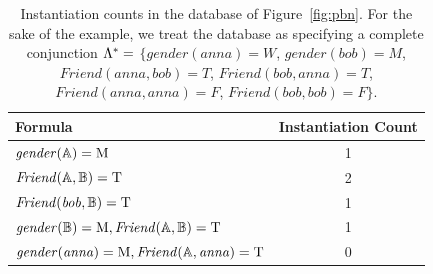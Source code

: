 \documentclass[twoside,11pt]{article}
\begin{document}
\begin{table}[htdp]
\caption{Instantiation counts in the database of Figure~\ref{fig:pbn}. For the sake of the example, we treat the database as specifying a complete conjunction $\Lambda^{*}\hspace{0.0ex} =$  $\{gender(anna) = W$,  $gender(bob) = M$, $Friend(anna,bob) = T$, $Friend(bob,anna) = T$, $Friend(anna,anna) = F$, $Friend(bob,bob) = F
\}$.}
\begin{center}
\begin{tabular}{lc}
Formula & Instantiation Count\\\hline
$\it{gender}(\mathbb{A}) = \mathrm{M}$ & 1 \\
$\it{Friend}(\mathbb{A},\mathbb{B}) = \mathrm{T}$ & 2\\
$\it{Friend}(bob,\mathbb{B}) = \mathrm{T}$ & 1 \\
$\it{gender}(\mathbb{B}) = \mathrm{M}, \it{Friend}(\mathbb{A},\mathbb{B}) = \mathrm{T}$ & 1 \\
$\it{gender}(anna) = \mathrm{M}, \it{Friend}(\mathbb{A}, anna) = \mathrm{T}$ & 0
\end{tabular}
\end{center}
\label{table:count-examples}
\end{table}%
\end{document}
